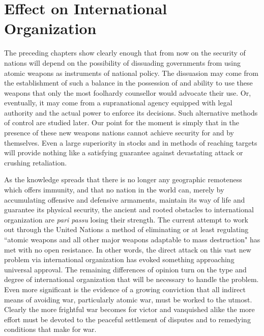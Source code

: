 
\chapter[Effect on International Organization]{Effect on International Organization}

\vspace{-2pt}


\vspace{39pt}

The preceding chapters show clearly enough that from now on the security of nations will depend on the possibility of dissuading governments from using atomic weapons as instruments of national policy. The dissuasion may come from the establishment of such a balance in the possession of and ability to use these weapons that only the most foolhardy counsellor would advocate their use. Or, eventually, it may come from a supranational agency equipped with legal authority and the actual power to enforce its decisions. Such alternative methods of control are studied later. Our point for the moment is simply that in the presence of these new weapons nations cannot achieve security for and by themselves. Even a large superiority in stocks and in methods of reaching targets will provide nothing like a satisfying guarantee against devastating attack or crushing retaliation.

As the knowledge spreads that there is no longer any geographic remoteness which offers immunity, and that no nation in the world can, merely by accumulating offensive and defensive armaments, maintain its way of life and guarantee its physical security, the ancient and rooted obstacles to international organization are \emph{pari passu} losing their strength. The current attempt to work out through the United Nations a method of eliminating or at least regulating ``atomic weapons and all other major weapons adaptable to mass destruction" has met with no open resistance. In other words, the direct attack on this vast new problem via international organization has evoked something approaching universal approval. The remaining differences of opinion turn on the type and degree of international organization that will be necessary to handle the problem. Even more significant is the evidence of a growing conviction that all indirect means of avoiding war, particularly atomic war, must be worked to the utmost. Clearly the more frightful war becomes for victor and vanquished alike the more effort must be devoted to the peaceful settlement of disputes and to remedying conditions that make for war.

